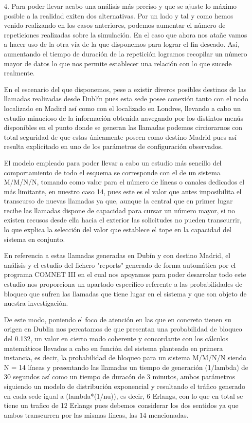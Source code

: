 4.
Para poder llevar acabo una análisis más preciso y que se ajuste lo máximo posible a la realidad exiten dos alternativas. Por un lado y tal y como hemos venido realizando en los casos anteriores, podemos aumentar el número de repeticiones realizadas sobre la simulación. En el caso que ahora nos atañe vamos a hacer uso de la otra vía de la que disponemos para lograr el fin deseado. Así, aumentando el tiempo de duración de la repetición logramos recopilar un número mayor de datos lo que nos permite establecer una relación con lo que sucede realmente.

En el escenario del que disponemos, pese a existir diveros posibles destinos de las llamadas realizadas desde Dublín pues esta sede posee conexión tanto con el nodo localizado en Madird así como con el localizado en Londres, llevando a cabo un estudio minucioso de la información obtenida navegando por los distintos menús disponibles en el punto donde se generan las llamadas podemos circiorarnos con total seguridad de que estas únicamente poseen como destino Madrid pues así resulta explicitado en uno de los parámetros de configuración observados.

El modelo empleado para poder llevar a cabo un estudio más sencillo del comportamiento de todo el esquema se corresponde con el de un sistema M/M/N/N, tomando como valor para el número de líneas o canales dedicados el más limitante, en nuestro caso 14, pues este es el valor que antes imposibilita el transcurso de nuevas llamadas ya que, aunque la central que en primer lugar recibe las llamadas dispone de capacidad para cursar un número mayor, si no existen recusos desde ella hacia el exterior las solicitudes no pueden transcurrir, lo que explica la selección del valor que establece el tope en la capacidad del sistema en conjunto.

En referencia a estas llamadas generadas en Dubín y con destino Madrid, el análisis y el estudio del fichero "reports" generado de forma automática por el programa COMNET III en el cual nos apoyamos para poder desarrolar todo este estudio nos proporciona un apartado específico referente a las probabilidades de bloqueo que sufren las llamadas que tiene lugar en el sistema y que son objeto de nuestra investigación.

De este modo, poniendo el foco de atención en las que en concreto tienen su origen en Dublin nos percatamos de que presentan una probabilidad de bloqueo del 0.132, un valor en cierto modo coherente y concordante con los cálculos matemáticos llevados a cabo en función del sistema planteado en primera instancia, es decir, la probabilidad de bloqueo para un sistema M/M/N/N siendo N = 14 líneas y presentando las llamadas un tiempo de generación (1/lambda) de 30 segundos así como un tiempo de duracón de 3 minutos, ambos parámetros siguiendo un modelo de distribución exponencial y resultando el tráfico generado en cada sede igual a (lambda*(1/nu)), es decir, 6 Erlangs, con lo que en total se tiene un trafico de 12 Erlangs pues debemos considerar los dos sentidos ya que ambos transcurren por las mismas líneas, las 14 mencionadas.

